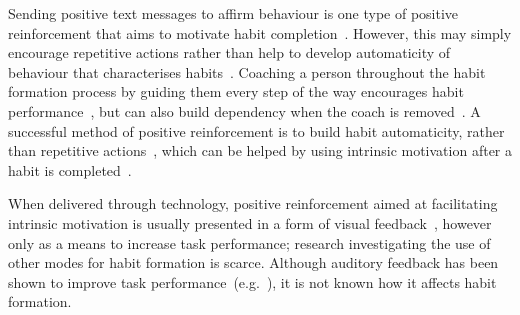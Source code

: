 \documentclass{scaffold/sigchi}
\begin{document}

Sending positive text messages to affirm behaviour is one type of positive reinforcement that aims to motivate habit completion~\cite{chi_crowd_designed_motivation}. However, this may simply encourage repetitive actions rather than help to develop automaticity of behaviour that characterises habits~\cite{habits_as_automaticity_not_frequency_gardner}. Coaching a person throughout the habit formation process by guiding them every step of the way encourages habit performance~\cite{coaching_not_that_good}, but can also build dependency when the coach is removed~\cite{article_dont_kick_habit, article_realtime_feedback_improving_medication_taking}. A successful method of positive reinforcement is to build habit automaticity, rather than repetitive actions~\cite{article_beyond_self_tracking_designing_apps}, which can be helped by using intrinsic motivation after a habit is completed~\cite{article_a_self_efficacy, article_meta_analytic_review_intrinsic_motivation}.

When delivered through technology, positive reinforcement aimed at facilitating intrinsic motivation is usually presented in a form of visual feedback~\cite{comparison_of_auditory_visual_feedback, visual_mode_better, article_realtime_feedback_improving_medication_taking}, however only as a means to increase task performance; research investigating the use of other modes for habit formation is scarce. Although auditory feedback has been shown to improve task performance~(e.g.~\cite{burke2006comparing, vazquez2012auditory, chi_oussama_tap_the_shapetones}), it is not known how it affects habit formation.

\end{document}
